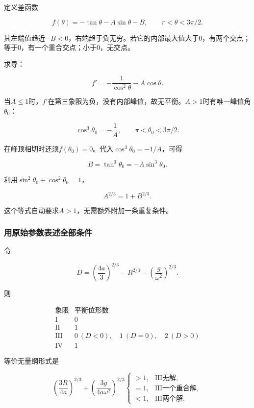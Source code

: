 \documentclass[12pt,a4paper,fontset=fandol]{ctexart}
\begin{document}
定义差函数

\[
f(\theta)=-\tan\theta-A\sin\theta-B,
\qquad \pi<\theta<3\pi/2.
\]

其左端值趋近\(-B<0\)，右端趋于负无穷。若它的内部最大值大于0，有两个交点；等于0，有一个重合交点；小于0，无交点。

求导：

\[
f'=-\frac1{\cos^2\theta}-A\cos\theta.
\]

当\(A\leq1\)时，\(f'\)在第三象限为负，没有内部峰值，故无平衡。\(A>1\)时有唯一峰值角\(\theta_0\)：

\[
\cos^3\theta_0=-\frac1A,
\qquad \pi<\theta_0<3\pi/2.
\]

在峰顶相切时还须\(f(\theta_0)=0\)。代入\(\cos^3\theta_0=-1/A\)，可得

\[
B=\tan^3\theta_0=-A\sin^3\theta_0.
\]

利用\(\sin^2\theta_0+\cos^2\theta_0=1\)，

\[
\boxed{A^{2/3}=1+B^{2/3}}.
\]

这个等式自动要求\(A>1\)，无需额外附加一条重复条件。

\subsubsection{用原始参数表述全部条件}\label{ux7528ux539fux59cbux53c2ux6570ux8868ux8ff0ux5168ux90e8ux6761ux4ef6}

令

\[
D=\left(\frac{4a}{3}\right)^{2/3}
-R^{2/3}-\left(\frac g{\omega^2}\right)^{2/3}.
\]

则

\[
\boxed{\begin{array}{c|c}
\text{象限}&\text{平衡位形数}\\ \hline
\mathrm I&0\\
\mathrm {II}&1\\
\mathrm {III}&0\ (D<0),\quad1\ (D=0),\quad2\ (D>0)\\
\mathrm {IV}&1
\end{array}}
\]

等价无量纲形式是

\[
\left(\frac{3R}{4a}\right)^{2/3}
+\left(\frac{3g}{4a\omega^2}\right)^{2/3}
\begin{cases}>1,&\mathrm{III}\text{无解},\\
=1,&\mathrm{III}\text{一个重合解},\\
<1,&\mathrm{III}\text{两个解}.
\end{cases}
\]
\end{document}
